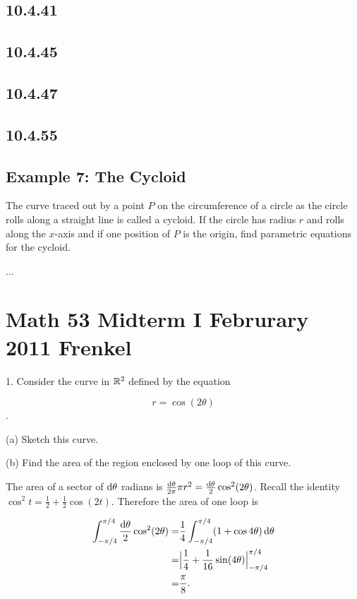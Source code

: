 \documentclass[12pt]{article}
\begin{document}
\subsection*{10.4.41}
\subsection*{10.4.45}
\subsection*{10.4.47}
\subsection*{10.4.55}



\subsection{Example 7: The Cycloid}
The curve traced out by a point $P$ on the circumference of a circle as the
circle rolls along a straight line is called a cycloid. If the circle has
radius $r$ and rolls along the $x$-axis and if one position of $P$ is the
origin, find parametric equations for the cycloid.
\begin{mdframed}
...
\end{mdframed}
\section{Math 53 Midterm I Februrary 2011 Frenkel}

1. Consider the curve in $\mathbb{R}^2$ defined by the equation

$$
r = \cos(2\theta)
$$.

(a) Sketch this curve.

(b) Find the area of the region enclosed by one loop of this curve.\\

\begin{mdframed}
The area of a sector of $\operatorname{\text{d}\theta}$ radians is $\frac{\operatorname{\text{d}\theta}}{2\pi}\pi r^2 = \frac{\operatorname{\text{d}\theta}}{2}\cos^2(2\theta)$. Recall the identity $\cos^2 t = \frac{1}{2} + \frac{1}{2}\cos(2t)$. Therefore the area of one loop is

\begin{align*}
  \int_{-\pi/4}^{\pi/4} \frac{\operatorname{\text{d}\theta}}{2}\cos^2(2\theta)
  =&\frac{1}{4}\int_{-\pi/4}^{\pi/4} (1 + \cos 4\theta) \operatorname{\text{d}\theta} \\
  =& \Big|\frac{1}{4} + \frac{1}{16}\sin(4\theta)\Big|_{-\pi/4}^{\pi/4} \\
  =& \frac{\pi}{8}.
\end{align*}

\end{mdframed}~\\
\end{document}
